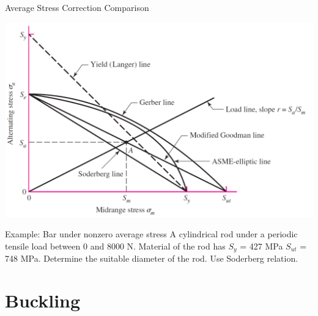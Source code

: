 \documentclass[10pt, svgnames]{beamer}
\begin{document}
\begin{frame}[label={sec:org1d96c98}]{Average Stress Correction Comparison}
\begin{center}
\includegraphics[width=.9\linewidth]{pictures/stresscorrection.pdf}
\end{center}
\end{frame}


\begin{frame}[label={sec:org1f85521}]{Example: Bar under nonzero average stress}
A cylindrical rod under a periodic tensile load between 0 and 8000 N. Material of the rod has \(S_y\) = 427 MPa  \(S_{ut}\) = 748 MPa. Determine the suitable diameter of the rod. Use Soderberg relation.

\begin{figure}[h]
\centering
{}
\end{figure}
\end{frame}

\section{Buckling}
\label{sec:orgc613d88}
\end{document}
